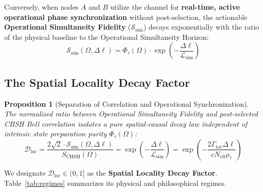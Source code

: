 \documentclass[11pt,a4paper]{article}
\newtheorem{proposition}{Proposition}
\begin{document}
Conversely, when nodes $A$ and $B$ utilize the channel for \textbf{real-time, active operational phase synchronization} without post-selection, the actionable \textbf{Operational Simultaneity Fidelity} ($\mathcal{S}_{\mathrm{sim}}$) decays exponentially with the ratio of the physical baseline to the Operational Simultaneity Horizon:
\begin{equation}
    \mathcal{S}_{\mathrm{sim}}(\Omega, \Delta\ell) = \Phi_\tau(\Omega) \cdot \exp\left(-\frac{\Delta\ell}{\mathcal{L}_{\mathrm{sim}}}\right)
    \label{eq:ssim}
\end{equation}

\subsection{The Spatial Locality Decay Factor}

\begin{proposition}[Separation of Correlation and Operational Synchronization]
The normalized ratio between Operational Simultaneity Fidelity and post-selected CHSH Bell correlation isolates a pure spatial-causal decay law independent of intrinsic state preparation purity $\Phi_\tau(\Omega)$:
\begin{equation}
    \mathcal{D}_{\mathrm{loc}} = \frac{2\sqrt{2} \cdot \mathcal{S}_{\mathrm{sim}}(\Omega, \Delta\ell)}{S_{\mathrm{CHSH}}(\Omega)} = \exp\left(-\frac{\Delta\ell}{\mathcal{L}_{\mathrm{sim}}}\right) = \exp\left(-\frac{2 \Gamma_{\mathrm{tot}} \Delta\ell}{c N_{\mathrm{eff}} \rho_\tau}\right)
    \label{eq:dloc}
\end{equation}
\end{proposition}

We designate $\mathcal{D}_{\mathrm{loc}} \in (0, 1]$ as the \textbf{Spatial Locality Decay Factor}. Table~\ref{tab:regimes} summarizes its physical and philosophical regimes.
\end{document}
